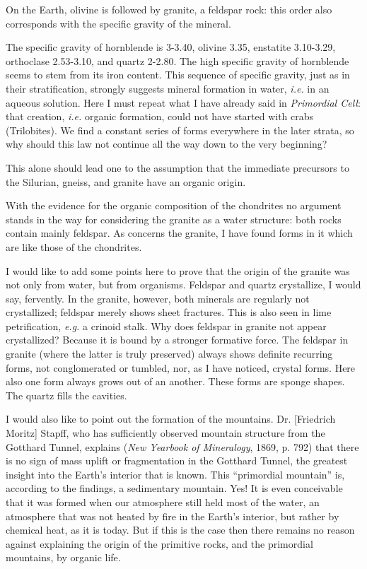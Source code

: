 \documentclass[a4paper, 12pt, oneside]{article}
\begin{document}
On the Earth, olivine is followed by granite, a feldspar rock: this order also corresponds with the specific gravity of the mineral.

The specific gravity of hornblende is 3-3.40, olivine 3.35, enstatite 3.10-3.29, orthoclase 2.53-3.10, and quartz 2-2.80. The high specific gravity of hornblende seems to stem from its iron content. This sequence of specific gravity, just as in their stratification, strongly suggests mineral formation in water, \emph{i.e.} in an aqueous solution. Here I must repeat what I have already said in \emph{Primordial Cell}: that creation, \emph{i.e.} organic formation, could not have started with crabs (Trilobites). We find a constant series of forms everywhere in the later strata, so why should this law not continue all the way down to the very beginning?

This alone should lead one to the assumption that the immediate precursors to the Silurian, gneiss, and granite have an organic origin.

With the evidence for the organic composition of the chondrites no argument stands in the way for considering the granite as a water structure: both rocks contain mainly feldspar. As concerns the granite, I have found forms in it which are like those of the chondrites.

I would like to add some points here to prove that the origin of the granite was not only from water, but from organisms. Feldspar and quartz crystallize, I would say, fervently. In the granite, however, both minerals are regularly not crystallized; feldspar merely shows sheet fractures. This is also seen in lime petrification, \emph{e.g.} a crinoid stalk. Why does feldspar in granite not appear crystallized? Because it is bound by a stronger formative force. The feldspar in granite (where the latter is truly preserved) always shows definite recurring forms, not conglomerated or tumbled, nor, as I have noticed, crystal forms. Here also one form always grows out of an another. These forms are sponge shapes. The quartz fills the cavities.

I would also like to point out the formation of the mountains. Dr. [Friedrich Moritz] Stapff, who has sufficiently observed mountain structure from the Gotthard Tunnel, explains (\emph{New Yearbook of Mineralogy}, 1869, p. 792) that there is no sign of mass uplift or fragmentation in the Gotthard Tunnel, the greatest insight into the Earth's interior that is known. This ``primordial mountain'' is, according to the findings, a sedimentary mountain. Yes! It is even conceivable that it was formed when our atmosphere still held most of the water, an atmosphere that was not heated by fire in the Earth's interior, but rather by chemical heat, as it is today. But if this is the case then there remains no reason against explaining the origin of the primitive rocks, and the primordial mountains, by organic life.
\end{document}
